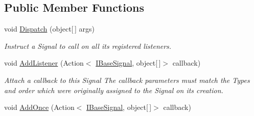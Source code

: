 \subsection*{Public Member Functions}
\begin{DoxyCompactItemize}
\item 
\hypertarget{interfacestrange_1_1extensions_1_1signal_1_1api_1_1_i_base_signal_a51e7fe8ae7a26ebeddbff1f9641515ad}{void \hyperlink{interfacestrange_1_1extensions_1_1signal_1_1api_1_1_i_base_signal_a51e7fe8ae7a26ebeddbff1f9641515ad}{Dispatch} (object\mbox{[}$\,$\mbox{]} args)}\label{interfacestrange_1_1extensions_1_1signal_1_1api_1_1_i_base_signal_a51e7fe8ae7a26ebeddbff1f9641515ad}

\begin{DoxyCompactList}\small\item\em Instruct a Signal to call on all its registered listeners. \end{DoxyCompactList}\item 
\hypertarget{interfacestrange_1_1extensions_1_1signal_1_1api_1_1_i_base_signal_a6793d4b57efe3f0e5c6e1cfbc5650fba}{void \hyperlink{interfacestrange_1_1extensions_1_1signal_1_1api_1_1_i_base_signal_a6793d4b57efe3f0e5c6e1cfbc5650fba}{Add\-Listener} (Action$<$ \hyperlink{interfacestrange_1_1extensions_1_1signal_1_1api_1_1_i_base_signal}{I\-Base\-Signal}, object\mbox{[}$\,$\mbox{]}$>$ callback)}\label{interfacestrange_1_1extensions_1_1signal_1_1api_1_1_i_base_signal_a6793d4b57efe3f0e5c6e1cfbc5650fba}

\begin{DoxyCompactList}\small\item\em Attach a callback to this Signal The callback parameters must match the Types and order which were originally assigned to the Signal on its creation. \end{DoxyCompactList}\item 
\hypertarget{interfacestrange_1_1extensions_1_1signal_1_1api_1_1_i_base_signal_a00b2908f0ce7467e85902fc076eb0d93}{void \hyperlink{interfacestrange_1_1extensions_1_1signal_1_1api_1_1_i_base_signal_a00b2908f0ce7467e85902fc076eb0d93}{Add\-Once} (Action$<$ \hyperlink{interfacestrange_1_1extensions_1_1signal_1_1api_1_1_i_base_signal}{I\-Base\-Signal}, object\mbox{[}$\,$\mbox{]}$>$ callback)}\label{interfacestrange_1_1extensions_1_1signal_1_1api_1_1_i_base_signal_a00b2908f0ce7467e85902fc076eb0d93}


\end{DoxyCompactItemize}
